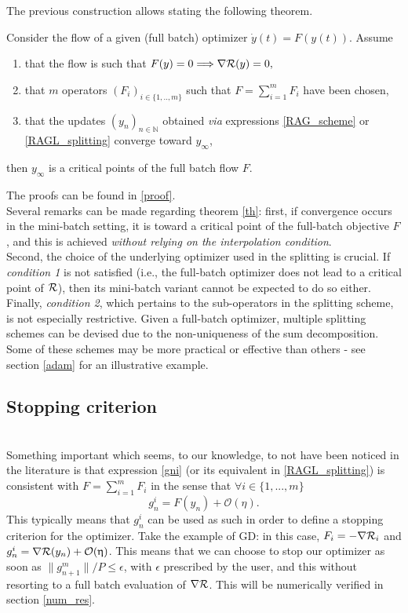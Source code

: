 \documentclass[article,authoryear,jmlmc]{beg_32}             %
\begin{document}
The previous construction allows stating the following theorem.
\begin{theorem}
\label{th}
  Consider the flow of a given (full batch) optimizer
$
\dot{y}(t) = F(y(t)).
$
Assume
\begin{enumerate}
\item  that the flow is such that 
$
F(y)=0 \Longrightarrow \nabla \mathcal{R}(y)=0,
$
\item that $m$ operators $(F_i)_{i\in\{1,..,m\}}$
such that $F=\sum_{i=1}^m F_i$ %
    have been chosen, 
\item that the updates $(y_n)_{n\in\mathbb{N}}$ obtained {\em via} expressions \eqref{RAG_scheme} or \eqref{RAGL_splitting}  converge toward $y_\infty$,
\end{enumerate}
 then $y_\infty$ is a critical points of the full batch flow $F$. 
\end{theorem}
The proofs can be found in \ref{proof}.\\

Several remarks can be made regarding theorem \ref{th}:
first, if convergence occurs in the mini-batch setting, it is toward a critical point of the full-batch objective $F$, and this is achieved {\em without relying on the
interpolation condition}.\\
Second, the choice of the underlying optimizer used in the splitting is crucial. If {\em condition 1} is not satisfied (i.e., the full-batch optimizer does not lead to a critical
point of $\mathcal{R}$), then its mini-batch variant cannot be expected to do so either.\\
Finally, {\em condition 2}, which pertains to the sub-operators in the splitting scheme, is not especially restrictive. 
Given a full-batch optimizer, multiple splitting schemes can be devised due to the non-uniqueness of the sum decomposition. Some of these schemes may be more practical or effective than others - see section \ref{adam} for an illustrative example.

\subsection{Stopping criterion}
~~\\
Something important which seems, to our knowledge, to not have been noticed in the literature is that 
  expression \eqref{gni} (or its equivalent in \eqref{RAGL_splitting}) is consistent with $F=\sum_{i=1}^m F_i$ in the sense that $\forall i\in\{1,...,m\}$ 
  \begin{equation}
    \label{stopping_criterion}
    g_n^i = F(y_n) +\mathcal{O}(\eta). 
  \end{equation}
  This typically means that $g_n^i$ can be used as such in order to define a stopping criterion for the optimizer.
  Take the example of GD: in this case, $F_i=-\nabla \mathcal{R}_i$ and $g_n^i = \nabla \mathcal{R}(y_n)+\mathcal{O}(\upeta)$. This means that we can choose to stop our optimizer as soon as $\|g_{n+1}^m\|/P \leq
  \epsilon$, with $\epsilon$ prescribed by the user, and this without resorting to a full batch evaluation of $\nabla \mathcal{R}$. This will be numerically verified in section \ref{num_res}. \\
\ \\
\end{document}
